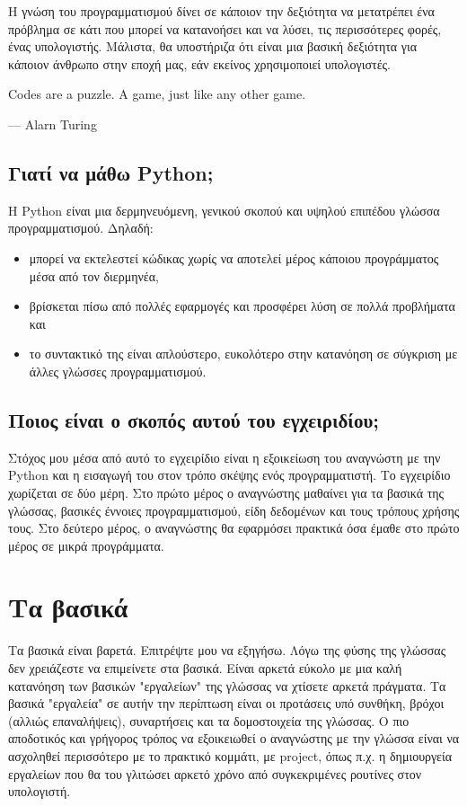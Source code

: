 \documentclass[14pt]{extreport}
\begin{document}
Η γνώση του προγραμματισμού δίνει σε κάποιον την δεξιότητα να μετατρέπει ένα πρόβλημα σε κάτι που μπορεί να κατανοήσει και να λύσει, τις περισσότερες φορές, ένας υπολογιστής. Μάλιστα, θα υποστήριζα ότι είναι μια βασική δεξιότητα για κάποιον άνθρωπο στην εποχή μας, εάν εκείνος χρησιμοποιεί υπολογιστές.

\epigraph{Codes are a puzzle. A game, just like any other game.}{--- Alarn Turing}

\section{Γιατί να μάθω Python;}

Η Python είναι μια δερμηνευόμενη, γενικού σκοπού και υψηλού επιπέδου γλώσσα
προγραμματισμού. Δηλαδή:
\begin{itemize}
    \item μπορεί να εκτελεστεί κώδικας χωρίς να αποτελεί μέρος κάποιου προγράμματος μέσα από τον διερμηνέα,
    \item βρίσκεται πίσω από πολλές εφαρμογές και προσφέρει λύση σε πολλά
          προβλήματα και
    \item το συντακτικό της είναι απλούστερο, ευκολότερο στην κατανόηση σε
          σύγκριση με άλλες γλώσσες προγραμματισμού.
\end{itemize}

\section{Ποιος είναι ο σκοπός αυτού του εγχειριδίου;}

Στόχος μου μέσα από αυτό το εγχειρίδιο είναι η εξοικείωση του αναγνώστη με την Python και η εισαγωγή του στον τρόπο σκέψης ενός προγραμματιστή. Το εγχειρίδιο χωρίζεται σε δύο μέρη. Στο πρώτο μέρος ο αναγνώστης μαθαίνει για τα βασικά της γλώσσας, βασικές έννοιες προγραμματισμού, είδη δεδομένων και τους τρόπους χρήσης τους. Στο δεύτερο μέρος, ο αναγνώστης θα εφαρμόσει πρακτικά όσα έμαθε στο πρώτο μέρος σε μικρά προγράμματα.

\chapter{Τα βασικά}

Τα βασικά είναι βαρετά. Επιτρέψτε μου να εξηγήσω. Λόγω της φύσης της γλώσσας δεν χρειάζεστε να επιμείνετε στα βασικά. Είναι αρκετά εύκολο με μια καλή κατανόηση των βασικών "εργαλείων" της γλώσσας να χτίσετε αρκετά πράγματα. Τα βασικά "εργαλεία" σε αυτήν την περίπτωση είναι οι προτάσεις υπό συνθήκη, βρόχοι (αλλιώς επαναλήψεις), συναρτήσεις και τα δομοστοιχεία της γλώσσας. Ο πιο αποδοτικός και γρήγορος τρόπος να εξοικειωθεί ο αναγνώστης με την γλώσσα είναι να ασχοληθεί περισσότερο με το πρακτικό κομμάτι, με project, όπως π.χ. η δημιουργεία εργαλείων που θα του γλιτώσει αρκετό χρόνο από συγκεκριμένες ρουτίνες στον υπολογιστή.
\end{document}
